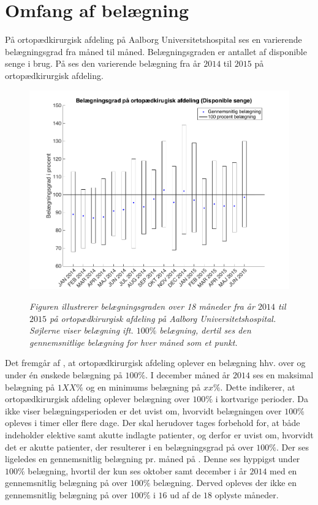 \section{Omfang af belægning}
På ortopædkirurgisk afdeling på Aalborg Universitetshospital ses en varierende belægningsgrad fra måned til måned. Belægningsgraden er antallet af disponible senge i brug. På  ses den varierende belægning fra år $2014$ til $2015$ på ortopædkirurgisk afdeling. \cite{SDS2015}


\begin{figure}[H]
	\flushleft 
	\centering
	\includegraphics[scale=.45]{figures/maxminoverbelaeg.png}
	\label{maxminbelaeg}
	\flushleft
	\caption{\textit{Figuren illustrerer belægningsgraden over 18 måneder fra år $2014$ til $2015$ på ortopædkirurgisk afdeling på Aalborg Universitetshospital. Søjlerne viser belægning ift. $100\%$ belægning, dertil ses den gennemsnitlige belægning for hver måned som et punkt.\cite{SDS2015}}}
\end{figure}

\noindent
Det fremgår af , at ortopædkirurgisk afdeling oplever en belægning hhv. over og under én ønskede belægning på $100 \%$. I december måned år $2014$ ses en maksimal belægning på $1XX \%$ og en minimums belægning på $xx \%$. Dette indikerer, at ortopædkirurgisk afdeling oplever belægning over $100 \%$ i kortvarige perioder. Da  ikke viser belægningsperioden er det uvist om, hvorvidt belægningen over $100 \%$ opleves i timer eller flere dage. Der skal herudover tages forbehold for, at  både indeholder elektive samt akutte indlagte patienter, og derfor er uvist om, hvorvidt det er akutte patienter, der resulterer i en belægningsgrad på over $100 \%$. Der ses ligeledes en gennemsnitlig belægning pr. måned på . Denne ses hyppigst under $100 \%$ belægning, hvortil der kun ses oktober samt december i år $2014$ med en gennemsnitlig belægning på over $100 \%$ belægning. Derved opleves der ikke en gennemsnitlig belægning på over $100 \%$ i $16$ ud af de $18$ oplyste måneder. \cite{SDS2015}


